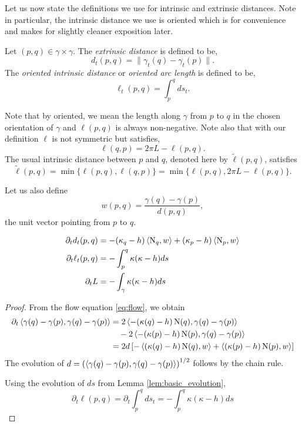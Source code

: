 \documentclass[a4paper, 12pt]{amsart}
\begin{document}
Let us now state the definitions we use for intrinsic and extrinsic distances. Note in particular, the intrinsic distance we use is oriented which is for convenience and makes for slightly cleaner exposition later.

\begin{defn}
\label{defn:dist}
Let \((p,q) \in \gamma \times \gamma\). The \emph{extrinsic distance} is defined to be,
\[
d_t(p, q) = \|\gamma_t(q) - \gamma_t(p)\|.
\]
The \emph{oriented intrinsic distance} or \emph{oriented arc length} is defined to be,
\[
\ell_t(p, q) = \int_p^q ds_t.
\]
\end{defn}

Note that by oriented, we mean the length along \(\gamma\) from \(p\) to \(q\) in the chosen orientation of \(\gamma\) and \(\ell(p, q)\) is always non-negative. Note also that with our definition \(\ell\) is not symmetric but satisfies,
\begin{equation}
\label{eq:ell_symmetry}
\ell(q, p) = 2\pi L - \ell(p, q).
\end{equation}
The usual intrinsic distance between \(p\) and \(q\), denoted here by \(\tilde{\ell}(p, q)\), satisfies
\[
\tilde{\ell}(p, q) = \min\{\ell(p, q), \ell(q, p)\} = \min\{\ell(p, q), 2\pi L - \ell(p, q)\}.
\]

Let us also define
\begin{equation}
\label{eq:w}
w(p, q) = \frac{\gamma(q) - \gamma(p)}{d(p,q)},
\end{equation}
the unit vector pointing from \(p\) to \(q\).

\begin{lemma}
\label{lem:distance_evolution}

\begin{align*}
\partial_t d_t(p, q) &= -(\kappa_q-h) \left\langle \operatorname{N}_q,w \right\rangle + (\kappa_p-h) \left\langle \operatorname{N}_p,w \right\rangle \\
\partial_t \ell_t(p, q) &= - \int_p^q \kappa(\kappa-h) ds \\
\partial_t L &= - \int_{\gamma} \kappa(\kappa-h) ds
\end{align*}
\end{lemma}

\begin{proof}
From the flow equation \eqref{eq:flow}, we obtain
\[
\begin{split}
\partial_t \left\langle \gamma(q) - \gamma(p),\gamma(q) - \gamma(p) \right\rangle &= 2 \left\langle -(\kappa(q)-h) \operatorname{N}(q),\gamma(q) - \gamma(p) \right\rangle \\
&\quad  - 2 \left\langle -(\kappa(p)-h) \operatorname{N}(p),\gamma(q) - \gamma(p) \right\rangle \\
&= 2 d\left[-\left\langle (\kappa(q)-h)\operatorname{N}(q),w \right\rangle + \left\langle (\kappa(p)-h)\operatorname{N}(p),w \right\rangle\right]
\end{split}
\]
The evolution of \(d = \left(\left\langle \gamma(q) - \gamma(p),\gamma(q) - \gamma(p) \right\rangle\right)^{1/2}\) follows by the chain rule.

Using the evolution of \(ds\) from Lemma \ref{lem:basic_evolution},
\[
\partial_t \ell(p,q) = \partial_t \int_p^q ds_t = -\int_p^q \kappa(\kappa-h) ds
\]
\end{proof}
\end{document}
